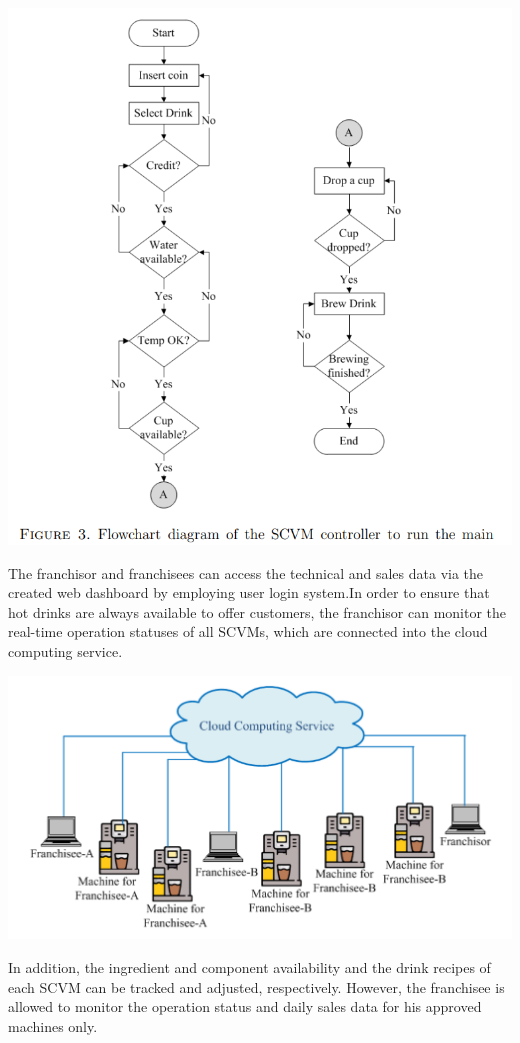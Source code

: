 \documentclass[letterpaper,12pt]{article}
\begin{document}
\includegraphics[scale=0.6]{cup.png}

The franchisor and franchisees can access the technical and sales data via the created web dashboard by employing user login system.In order to ensure that hot drinks are always available to offer customers, the franchisor can monitor the real-time operation statuses of all SCVMs, which are connected into the cloud computing service.

\includegraphics[scale=0.5]{cloud.png}

In addition, the ingredient and component availability and the drink recipes of each SCVM can be tracked and adjusted, respectively. However, the franchisee is allowed to monitor the operation status and daily sales data for his approved machines only.
\end{document}
